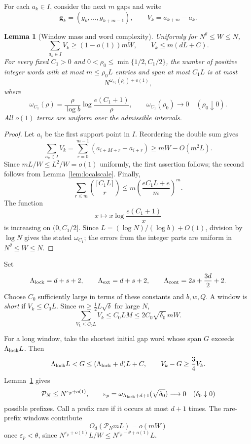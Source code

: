 \documentclass[a4paper,10pt]{amsart}
\newtheorem{lemma}[theorem]{Lemma}
\theoremstyle{remark}
\begin{document}
For each $a_k\in I$, consider the next $m$ gaps and write
\[
 \mathbf g_k=(g_k,\ldots,g_{k+m-1}),\qquad
 V_k=a_{k+m}-a_k.
\]

\begin{lemma}[Window mass and word complexity]\label{lem:windows}
Uniformly for $N^\theta\le W\le N$,
\[
 \sum_{a_k\in I}V_k\ge(1-o(1))mW,\qquad
 V_k\le m(dL+C).
\]
For every fixed $C_1>0$ and
$0<\rho_0\le\min\{1/2,C_1/2\}$, the number of positive integer
words with at most $m\le\rho_0L$ entries and span at most $C_1L$ is at most
\[
 N^{\omega_{C_1}(\rho_0)+o(1)},
\]
where
\[
 \omega_{C_1}(\rho)
 =\frac{\rho}{\log b}\log\frac{e(C_1+1)}{\rho},
 \qquad
 \omega_{C_1}(\rho_0)\longrightarrow0
 \quad(\rho_0\downarrow0).
\]
All $o(1)$ terms are uniform over the admissible intervals.
\end{lemma}

\begin{proof}
Let $a_i$ be the first support point in $I$. Reordering the double sum gives
\[
 \sum_{a_k\in I}V_k
 =\sum_{r=0}^{m-1}(a_{i+M+r}-a_{i+r})
 \ge mW-O(m^2L).
\]
Since $mL/W\le L^2/W=o(1)$ uniformly, the first assertion follows; the
second follows from Lemma~\ref{lem:localscale}. Finally,
\[
 \sum_{r\le m}\binom{\lceil C_1L\rceil}{r}
 \le m\left(\frac{eC_1L+e}{m}\right)^m.
\]
The function
\[
 x\longmapsto x\log\frac{e(C_1+1)}{x}
\]
is increasing on $(0,C_1/2]$. Since $L=(\log N)/(\log b)+O(1)$,
division by $\log N$ gives
the stated $\omega_{C_1}$; the errors from the integer parts are uniform in
$N^\theta\le W\le N$.
\end{proof}

Set
\[
 \Lambda_{\rm lock}=d+s+2,\qquad
 \Lambda_{\rm ext}=d+s+2,\qquad
 \Lambda_{\rm cont}=2s+\frac{3d}{2}+2.
\]
Choose $C_0$ sufficiently large in terms of these constants and $b,w,Q$.
A window is \emph{short} if $V_k\le C_0L$. Since
$m\ge\frac12L\sqrt\delta$ for large $N$,
\begin{equation}\label{eq:short}
 \sum_{V_k\le C_0L}V_k
 \le C_0LM
 \le2C_0\sqrt{\delta_0}\,mW.
\end{equation}

For a long window, take the shortest initial gap word whose span $G$ exceeds
$\Lambda_{\rm lock}L$. Then
\begin{equation}\label{eq:prefixspan}
 \Lambda_{\rm lock}L<G
 \le(\Lambda_{\rm lock}+d)L+C,\qquad
 V_k-G\ge\frac34V_k.
\end{equation}
Lemma~\ref{lem:windows} gives
\begin{equation}\label{eq:prefixcount}
 \mathcal P_N\le N^{\varepsilon_p+o(1)},\qquad
 \varepsilon_p
 =\omega_{\Lambda_{\rm lock}+d+1}(\sqrt{\delta_0})
 \longrightarrow0\quad(\delta_0\downarrow0)
\end{equation}
possible prefixes. Call a prefix rare if it occurs at most $d+1$ times.
The rare-prefix windows contribute
\begin{equation}\label{eq:rare}
 O_d(\mathcal P_NmL)=o(mW)
\end{equation}
once $\varepsilon_p<\theta$, since
$N^{\varepsilon_p+o(1)}L/W\le
N^{\varepsilon_p-\theta+o(1)}L$.
\end{document}

